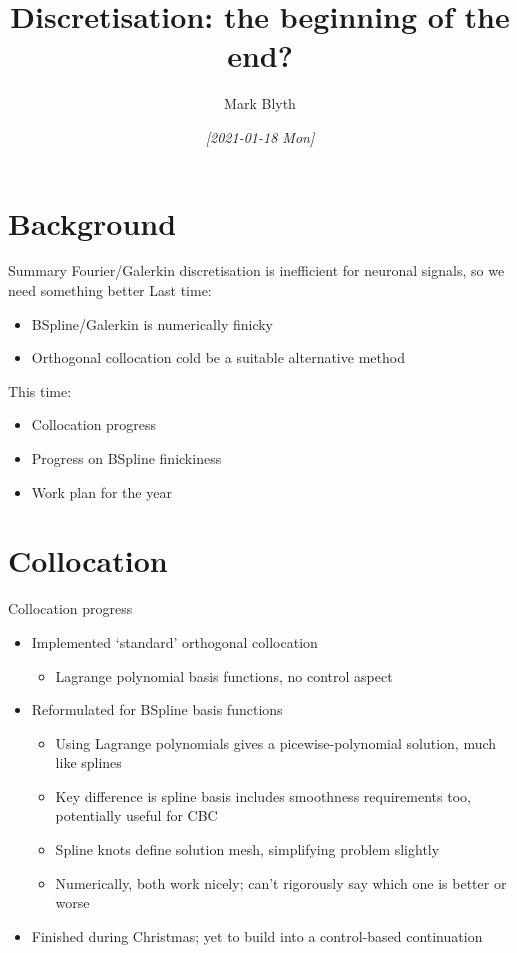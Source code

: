 \documentclass[presentation]{beamer}
\author{Mark Blyth}
\date{\textit{[2021-01-18 Mon]}}
\title{Discretisation: the beginning of the end?}
\begin{document}
\maketitle

\section{Background}
\label{sec:orgca5dbae}
\begin{frame}[label={sec:org3507513}]{Summary}
Fourier/Galerkin discretisation is inefficient for neuronal signals, so we need something better
\vfill
Last time:
\begin{itemize}
\item BSpline/Galerkin is numerically finicky
\item Orthogonal collocation cold be a suitable alternative method
\end{itemize}
\vfill
This time:
\begin{itemize}
\item Collocation progress
\item Progress on BSpline finickiness
\item Work plan for the year
\end{itemize}
\end{frame}

\section{Collocation}
\label{sec:org83a566a}
\begin{frame}[label={sec:org3fc5ef5}]{Collocation progress}
\begin{itemize}
\item Implemented `standard' orthogonal collocation
\begin{itemize}
\item Lagrange polynomial basis functions,  no control aspect
\end{itemize}
\end{itemize}
\vfill
\begin{itemize}
\item Reformulated for BSpline basis functions
\begin{itemize}
\item Using Lagrange polynomials gives a picewise-polynomial solution, much like splines
\item Key difference is spline basis includes smoothness requirements too, potentially useful for CBC
\item Spline knots define solution mesh, simplifying problem slightly
\item Numerically, both work nicely; can't rigorously say which one is better or worse
\end{itemize}
\end{itemize}
\vfill
\begin{itemize}
\item Finished during Christmas; yet to build into a control-based continuation
\end{itemize}
\end{frame}
\end{document}
